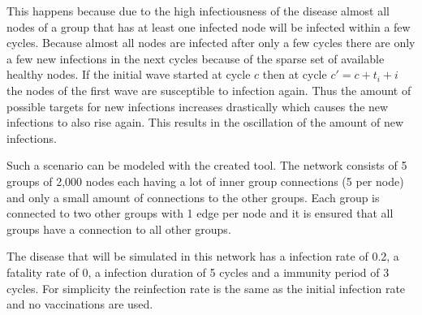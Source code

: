 This happens because due to the high infectiousness of the disease almost all nodes of 
a group that has at least one infected node will be infected within a few cycles. Because
almost all nodes are infected after only a few cycles there are only a few new infections 
in the next cycles because of the sparse set of available healthy nodes. If the initial
wave started at cycle $c$ then at cycle $c' = c + t_i + i$ the nodes of the first wave 
are susceptible to infection again. Thus the amount of possible targets for new infections
increases drastically which causes the new infections to also rise again. This results in 
the oscillation of the amount of new infections.

Such a scenario can be modeled with the created tool. The network consists of 5 groups of 2,000 nodes
each having a lot of inner group connections (5 per node) and only a small amount of connections to the
other groups. Each group is connected to two other groups with 1 edge per node and it is ensured that
all groups have a connection to all other groups.

The disease that will be simulated in this network has a infection rate of 0.2, a fatality
rate of 0, a infection duration of 5 cycles and a immunity period of 3 cycles. For simplicity
the reinfection rate is the same as the initial infection rate and no vaccinations are used.

